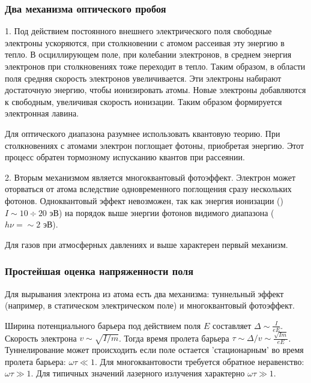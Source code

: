 \documentclass{beamer}
\begin{document}
	\begin{frame}
		\frametitle{Два механизма оптического пробоя}
		1.
		Под действием постоянного внешнего электрического поля свободные электроны ускоряются, при столкновении с атомом рассеивая эту энергию в тепло. В осциллирующем поле, при колебании электронов, в среднем энергия электронов при столкновениях тоже переходит в тепло. Таким образом, в области поля средняя скорость электронов увеличивается. Эти электроны набирают достаточную энергию, чтобы ионизировать атомы. Новые электроны добавляются к свободным, увеличивая скорость ионизации. Таким образом формируется электронная лавина.
		
		Для оптического диапазона разумнее использовать квантовую теорию. При столкновениях с атомами электрон поглощает фотоны, приобретая энергию. Этот процесс обратен тормозному испусканию квантов при рассеянии.
		
		2. Вторым механизмом является многоквантовый фотоэффект. Электрон может оторваться от атома вследствие одновременного поглощения сразу нескольких фотонов. Одноквантовый эффект невозможен, так как энергия ионизации ()$I \sim 10\div20$ эВ) на порядок выше энергии фотонов видимого диапазона ($ h\nu = \sim 2$ эВ).
		
		Для газов при атмосферных давлениях и выше характерен первый механизм.
	\end{frame}
	
	\begin{frame}
		\frametitle{Простейшая оценка напряженности поля}
		
		Для вырывания электрона из атома есть два механизма: туннельный эффект (например, в статическом электрическом поле) и многоквантовый фотоэффект.
		
		Ширина потенциального барьера под действием поля $E$ составляет $\Delta \sim \frac{I}{eE}$. Скорость электрона $v \sim \sqrt{I/m}$. Тогда время пролета барьера $\tau \sim \Delta / v \sim \frac{\sqrt{Im}}{eE}$. Туннелирование может происходить если поле остается 'стационарным' во время пролета барьера: $\omega \tau \ll 1$. Для многоквантовости требуется обратное неравенство: $\omega \tau \gg 1$. Для типичных значений лазерного излучения характерно $\omega \tau \gg 1$.
		
	\end{frame}
		
\end{document}
